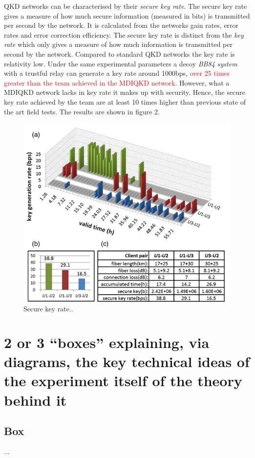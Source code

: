 \documentclass{article}
\begin{document}
QKD networks can be characterised by their \textit{secure key rate}.  The secure key rate gives a measure of how much secure information (measured in bits) is transmitted per second by the network. It is calculated from the networks gain rates, error rates and error correction efficiency. The secure key rate is distinct from the \textit{key rate} which only gives a measure of how much information is transmitted per second by the network. Compared to standard QKD networks the key rate is relativity low. Under the same experimental parameters a decoy \textit{BB84 system} with a trustful relay can generate a key rate around 1000bps, \textcolor{red}{over 25 times greater than the team achieved in the MDIQKD network}. However, what a MDIQKD network lacks in key rate it makes up with security. Hence, the secure key rate achieved by the team are at least 10 times higher than previous state of the art field tests. The results are shown in figure 2.

    
\begin{figure}
  \centering 
  \includegraphics[width=0.7\linewidth]{Results.png}
  \caption{Secure key rate.\cite{PhysRevX.6.011024}.}
  \label{figure 2}
\end{figure}

\section*{2 or 3 “boxes” explaining, via diagrams, the key technical ideas of the experiment itself of the theory behind it}

\subsection*{Box}
...

   


  
  
\end{document}
